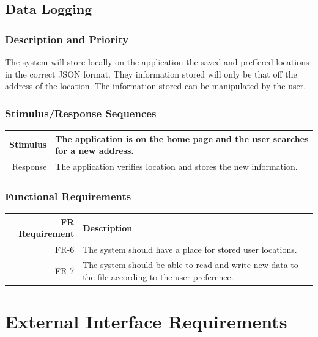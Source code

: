 \documentclass[12pt,oneside,letterpaper]{article}
\begin{document}
\subsection{Data Logging}
\subsubsection{Description and Priority}
The system will store locally on the application the saved and preffered locations in the correct JSON format. They information stored will only be that off the address of the location. The information stored can be manipulated by the user.
\subsubsection{Stimulus/Response Sequences}
\begin{longtable}{|r|p{3.8in}|}
\hline
Stimulus & The application is on the home page and the user searches for a new address. \\
\hline
Response & The application verifies location and stores the new information. \\
\hline
\end{longtable}
\subsubsection{Functional Requirements}
\begin{longtable}{|r|p{3.8in}|}
\hline
FR Requirement & Description \\
\hline
FR-6 & The system should have a place for stored user locations. \\
FR-7 & The system should be able to read and write new data to the file according to the user preference. \\
\hline
\end{longtable}

\section{External Interface Requirements}
\end{document}
